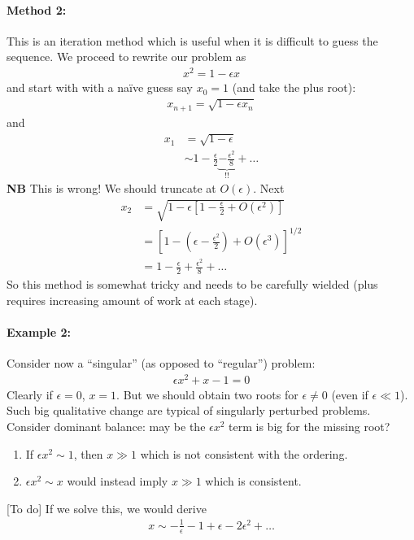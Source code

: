 \paragraph{Method 2:} This is an iteration method which is useful when it is difficult to guess the sequence. We proceed to rewrite our problem as
\begin{gather*}
	x^2 = 1 - \epsilon x
\end{gather*}
and start with with a na\"{i}ve guess say $x_0 = 1$ (and take the plus root):
\begin{align*}
	x_{n+1} = \sqrt{1 - \epsilon x_n}
\end{align*}
and
\begin{align*}
	x_1 &= \sqrt{1 - \epsilon} \\
	&\sim  1 - \frac{\epsilon}{2} \underbrace{- \frac{\epsilon^2}{8}}_\text{!!} + \dots 
\end{align*}
{\bf NB} This is wrong! We should truncate at $O(\epsilon)$. Next
\begin{align*}
	x_2 &= \sqrt{1 - \epsilon\left[1 - \frac{\epsilon}{2} + O(\epsilon^2)\right]} \\
	&= \left[1 - \left(\epsilon - \frac{\epsilon^2}{2}\right) + O(\epsilon^3)\right]^{1/2} \\
	&= 1 - \frac{\epsilon}{2} + \frac{\epsilon^2}{8} + \dots 
\end{align*}
So this method is somewhat tricky and needs to be carefully wielded (plus requires increasing amount of work at each stage). 


\paragraph{Example 2:} Consider now a ``singular'' (as opposed to ``regular'') problem:
\begin{gather*}
	\epsilon x^2 + x - 1 = 0
\end{gather*}
Clearly if $\epsilon = 0$, $x = 1$. But we should obtain two roots for $\epsilon \neq 0 $ (even if $\epsilon \ll 1$). Such big qualitative change are typical of singularly perturbed problems. Consider dominant balance: may be the $\epsilon x^2$ term is big for the missing root?
\begin{enumerate}
	\item If $\epsilon x^2 \sim 1$, then $x \gg 1$ which is not consistent with the ordering.
	\item $\epsilon x^2 \sim x$ would instead imply $x \gg 1$ which is consistent. 
\end{enumerate}
{\color{red} [To do]} If we solve this, we would derive
\begin{gather*}
	x \sim -\frac{1}{\epsilon} - 1 + \epsilon - 2\epsilon^2 + \dots 
\end{gather*}

